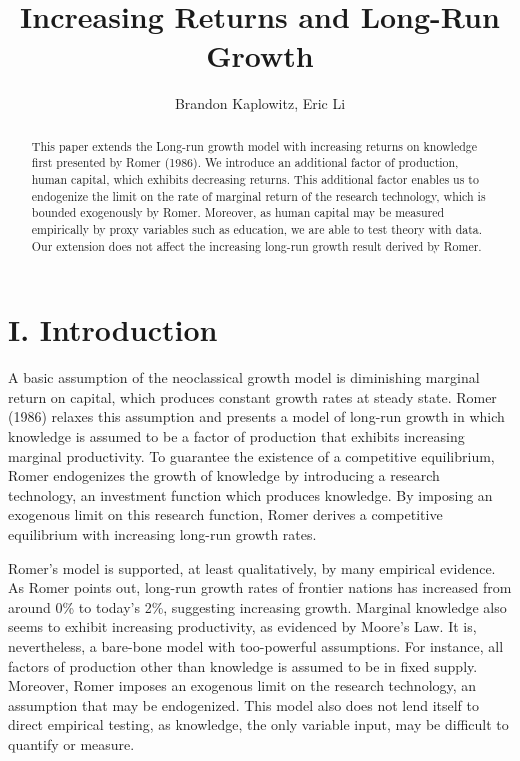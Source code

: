 \documentclass[Journal,letterpaper, NoLineNumbers]{ascelike-new}
\begin{document}
\title{Increasing Returns and Long-Run Growth}

\author[1]{Brandon Kaplowitz, Eric Li}
\maketitle

\begin{abstract}
This paper extends the Long-run growth model with increasing returns on knowledge first presented by Romer (1986). We introduce an additional factor of production, human capital, which exhibits decreasing returns. This additional factor enables us to endogenize the limit on the rate of marginal return of the research technology, which is bounded exogenously by Romer. Moreover, as human capital may be measured empirically by proxy variables such as education, we are able to test theory with data. Our extension does not affect the increasing long-run growth result derived by Romer.  

\end{abstract}

\section{I. Introduction}
A basic assumption of the neoclassical growth model is diminishing marginal return on capital, which produces constant growth rates at steady state. Romer (1986) relaxes this assumption and presents a model of long-run growth in which knowledge is assumed to be a factor of production that exhibits increasing marginal productivity. To guarantee the existence of a competitive equilibrium, Romer endogenizes the growth of knowledge by introducing a research technology, an investment function which produces knowledge. By imposing an exogenous limit on this research function, Romer derives a competitive equilibrium with increasing long-run growth rates. 

Romer's model is supported, at least qualitatively, by many empirical evidence. As Romer points out, long-run growth rates of frontier nations has increased from around 0\% to today's 2\%, suggesting increasing growth. Marginal knowledge also seems to exhibit increasing productivity, as evidenced by Moore's Law. It is, nevertheless, a bare-bone model with too-powerful assumptions. For instance, all factors of production other than knowledge is assumed to be in fixed supply. Moreover, Romer imposes an exogenous limit on the research technology, an assumption that may be endogenized. This model also does not lend itself to direct empirical testing, as knowledge, the only variable input, may be difficult to quantify or measure. 
\end{document}
